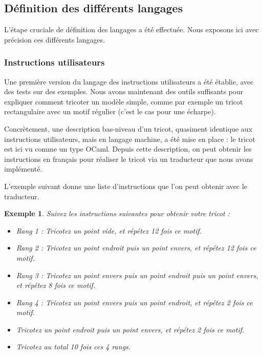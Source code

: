 \documentclass{article}
\newtheorem{ex}{Exemple}
\begin{document}
\subsection{Définition des différents langages}

L'étape cruciale de définition des langages a été effectuée. Nous exposons ici avec précision ces différents langages.

\subsubsection{Instructions utilisateurs}

Une première version du langage des instructions utilisateurs a été établie, avec des tests sur des exemples. Nous avons maintenant des outils
suffisants pour expliquer comment tricoter un modèle simple, comme par exemple un tricot rectangulaire avec un motif régulier (c'est le cas pour une écharpe).

Concrètement, une description bas-niveau d'un tricot, quasiment identique aux instructions utilisateurs, mais en langage machine, a été mise en place : le tricot
est ici vu comme un type OCaml. Depuis cette description, on peut obtenir les instructions en français pour réaliser le tricot via un traducteur que nous avons implémenté.

L'exemple suivant donne une liste d'instructions que l'on peut obtenir avec le traducteur.

\begin{ex}
  Suivez les instructions suivantes pour obtenir votre tricot : 
  
  \begin{itemize}
  \item Rang 1 : Tricotez un point vide, et répétez 12 fois ce motif. 
  \item Rang 2 : Tricotez un point endroit puis un point envers, et répétez 12 fois ce motif. 
  \item Rang 3 : Tricotez un point envers puis un point endroit puis un point envers, et répétez 8 fois ce motif. 
  \item Rang 4 : Tricotez un point envers puis un point endroit, et répétez 2 fois ce motif. 
  \item Tricotez un point endroit puis un point envers, et répétez 2 fois ce motif. 
  \item Tricotez au total 10 fois ces 4 rangs.
  \end{itemize}
\end{ex}
\end{document}
